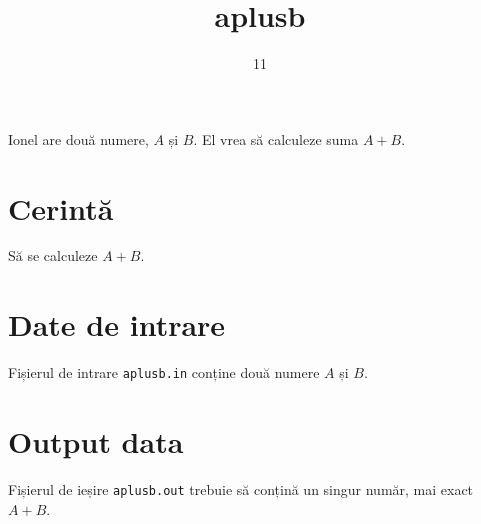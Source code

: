 \documentclass[ro,files,otherlogo]{problem}
\title{aplusb}
\date{11}{2}{2022}
\begin{document}
\maketitle

Ionel are două numere, $A$ și $B$. El vrea să calculeze suma $A + B$.

\section{Cerintă}

Să se calculeze $A + B$.

\section{Date de intrare}

Fișierul de intrare \texttt{aplusb.in} conține două numere $A$ și $B$.

\section{Output data}

Fișierul de ieșire \texttt{aplusb.out} trebuie să conțină un singur număr, mai exact $A + B$.

\begin{restrictions}
\end{restrictions}

\begin{examplesexplained}
%
%
\end{examplesexplained}
\end{document}
